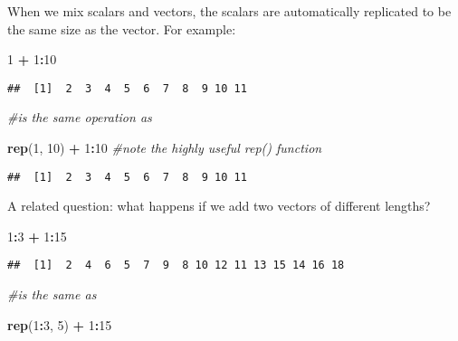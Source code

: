 \documentclass[]{article}
\newenvironment{Shaded}{\begin{snugshade}}{\end{snugshade}}
\newcommand{\KeywordTok}[1]{\textcolor[rgb]{0.13,0.29,0.53}{\textbf{#1}}}
\newcommand{\DecValTok}[1]{\textcolor[rgb]{0.00,0.00,0.81}{#1}}
\newcommand{\StringTok}[1]{\textcolor[rgb]{0.31,0.60,0.02}{#1}}
\newcommand{\CommentTok}[1]{\textcolor[rgb]{0.56,0.35,0.01}{\textit{#1}}}
\newcommand{\OperatorTok}[1]{\textcolor[rgb]{0.81,0.36,0.00}{\textbf{#1}}}
\newcommand{\NormalTok}[1]{#1}
\begin{document}
When we mix scalars and vectors, the scalars are automatically
replicated to be the same size as the vector. For example:

\begin{Shaded}
\begin{Highlighting}[]
\DecValTok{1} \OperatorTok{+}\StringTok{ }\DecValTok{1}\OperatorTok{:}\DecValTok{10}
\end{Highlighting}
\end{Shaded}

\begin{verbatim}
##  [1]  2  3  4  5  6  7  8  9 10 11
\end{verbatim}

\begin{Shaded}
\begin{Highlighting}[]
\CommentTok{#is the same operation as }

\KeywordTok{rep}\NormalTok{(}\DecValTok{1}\NormalTok{, }\DecValTok{10}\NormalTok{) }\OperatorTok{+}\StringTok{ }\DecValTok{1}\OperatorTok{:}\DecValTok{10} \CommentTok{#note the highly useful rep() function}
\end{Highlighting}
\end{Shaded}

\begin{verbatim}
##  [1]  2  3  4  5  6  7  8  9 10 11
\end{verbatim}

A related question: what happens if we add two vectors of different
lengths?

\begin{Shaded}
\begin{Highlighting}[]
\DecValTok{1}\OperatorTok{:}\DecValTok{3} \OperatorTok{+}\StringTok{ }\DecValTok{1}\OperatorTok{:}\DecValTok{15}
\end{Highlighting}
\end{Shaded}

\begin{verbatim}
##  [1]  2  4  6  5  7  9  8 10 12 11 13 15 14 16 18
\end{verbatim}

\begin{Shaded}
\begin{Highlighting}[]
\CommentTok{#is the same as}

\KeywordTok{rep}\NormalTok{(}\DecValTok{1}\OperatorTok{:}\DecValTok{3}\NormalTok{, }\DecValTok{5}\NormalTok{) }\OperatorTok{+}\StringTok{ }\DecValTok{1}\OperatorTok{:}\DecValTok{15}
\end{Highlighting}
\end{Shaded}
\end{document}
